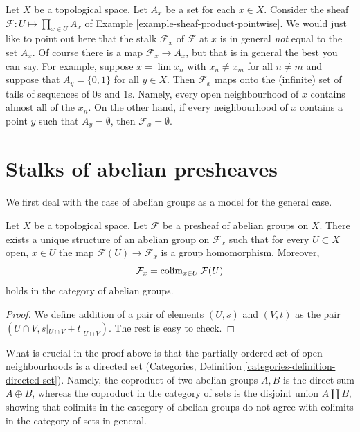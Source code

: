\begin{example}
\label{example-sheaf-product-pointwise-stalk}
Let $X$ be a topological space. Let $A_x$ be a set for each $x \in X$.
Consider the sheaf $\mathcal{F} : U \mapsto \prod_{x\in U} A_x$ of Example
\ref{example-sheaf-product-pointwise}. We would just like to point
out here that the stalk $\mathcal{F}_x$ of $\mathcal{F}$ at $x$
is in general {\it not} equal to the set $A_x$. Of course there is
a map $\mathcal{F}_x \to A_x$, but that is in general the best you
can say. For example, suppose $x = \lim x_n$ with $x_n \not = x_m$ for
all $n \not = m$ and suppose that $A_y = \{0, 1\}$ for all $y \in X$. Then
$\mathcal{F}_x$ maps onto the (infinite) set of tails of sequences
of $0$s and $1$s. Namely, every open neighbourhood of $x$ contains almost
all of the $x_n$. On the other hand, if every neighbourhood of $x$ contains
a point $y$ such that $A_y = \emptyset$, then $\mathcal{F}_x = \emptyset$.
\end{example}



\section{Stalks of abelian presheaves}
\label{section-stalks-abelian-presheaves}

\noindent
We first deal with the case of abelian groups as
a model for the general case.

\begin{lemma}
\label{lemma-stalk-abelian-presheaf}
Let $X$ be a topological space. Let $\mathcal{F}$ be a presheaf
of abelian groups on $X$. There exists a unique structure of an
abelian group on $\mathcal{F}_x$ such that for every
$U \subset X$ open, $x\in U$ the map $\mathcal{F}(U) \to \mathcal{F}_x$
is a group homomorphism. Moreover,
$$
\mathcal{F}_x
=
\mathop{\mathrm{colim}}\nolimits_{x\in U} \mathcal{F}(U)
$$
holds in the category of abelian groups.
\end{lemma}

\begin{proof}
We define addition of a pair of elements
$(U, s)$ and $(V, t)$ as the pair $(U \cap V, s|_{U\cap V} +
t|_{U \cap V})$. The rest is easy to check.
\end{proof}

\noindent
What is crucial in the proof above is that the partially ordered set of open
neighbourhoods is a directed set (Categories, Definition
\ref{categories-definition-directed-set}). Namely, the coproduct
of two abelian groups $A, B$ is the direct sum $A \oplus B$, whereas
the coproduct in the category of sets is the disjoint
union $A \amalg B$, showing that colimits in the category
of abelian groups do not agree with colimits in the
category of sets in general.


